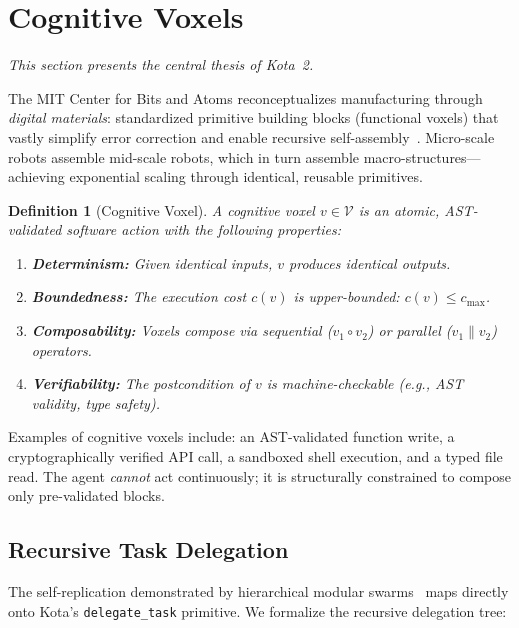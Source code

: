\documentclass[11pt,a4paper]{article}
\newtheorem{definition}{Definition}
\begin{document}
\section{Cognitive Voxels}
\label{sec:voxels}

\emph{This section presents the central thesis of Kota~2.}

The MIT Center for Bits and Atoms reconceptualizes manufacturing through \emph{digital materials}: standardized primitive building blocks (functional voxels) that vastly simplify error correction and enable recursive self-assembly~\citep{abdelrahman2022self, smith2025voxel}. Micro-scale robots assemble mid-scale robots, which in turn assemble macro-structures---achieving exponential scaling through identical, reusable primitives.

\begin{definition}[Cognitive Voxel]
A \emph{cognitive voxel} $v \in \mathcal{V}$ is an atomic, AST-validated software action with the following properties:
\begin{enumerate}
    \item \textbf{Determinism:} Given identical inputs, $v$ produces identical outputs.
    \item \textbf{Boundedness:} The execution cost $c(v)$ is upper-bounded: $c(v) \leq c_{\max}$.
    \item \textbf{Composability:} Voxels compose via sequential ($v_1 \circ v_2$) or parallel ($v_1 \| v_2$) operators.
    \item \textbf{Verifiability:} The postcondition of $v$ is machine-checkable (e.g., AST validity, type safety).
\end{enumerate}
\end{definition}

\noindent Examples of cognitive voxels include: an AST-validated function write, a cryptographically verified API call, a sandboxed shell execution, and a typed file read. The agent \emph{cannot} act continuously; it is structurally constrained to compose only pre-validated blocks.

\subsection{Recursive Task Delegation}

The self-replication demonstrated by hierarchical modular swarms~\citep{abdelrahman2022self} maps directly onto Kota's \texttt{delegate\_task} primitive. We formalize the recursive delegation tree:
\end{document}
